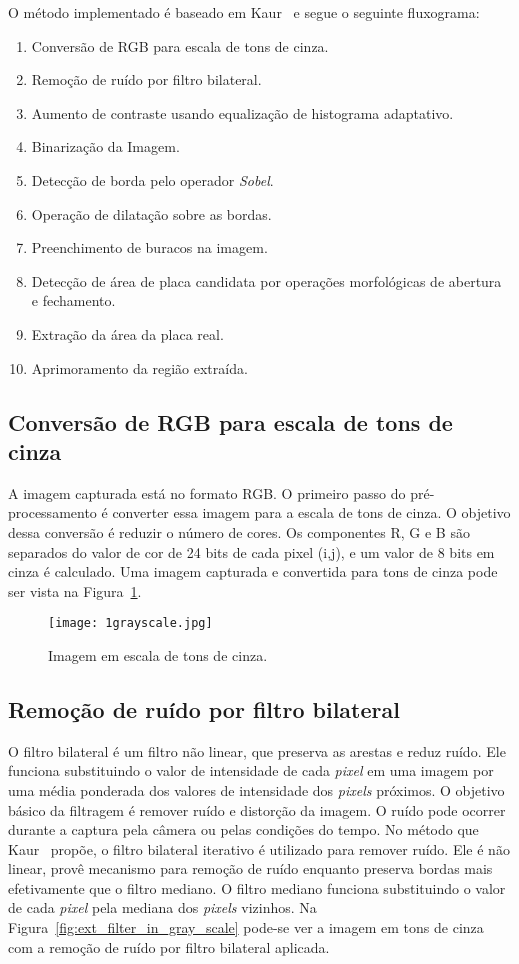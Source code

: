 O método implementado é baseado em Kaur~\cite{kaur2014efficient} e segue o seguinte fluxograma:

\begin{enumerate}
	\item Conversão de RGB para escala de tons de cinza.
	\item Remoção de ruído por filtro bilateral.
	\item Aumento de contraste usando equalização de histograma adaptativo.
	\item Binarização da Imagem.
	\item Detecção de borda pelo operador \emph{Sobel}.
	\item Operação de dilatação sobre as bordas.
	\item Preenchimento de buracos na imagem.
	\item Detecção de área de placa candidata por operações morfológicas de abertura e fechamento.
	\item Extração da área da placa real.
	\item Aprimoramento da região extraída.
\end{enumerate}

\subsection{Conversão de RGB para escala de tons de cinza}

A imagem capturada está no formato RGB\@. O primeiro passo do pré-processamento
é converter essa imagem para a escala de tons de cinza. O objetivo dessa
conversão é reduzir o número de cores. Os componentes R, G e B são separados do
valor de cor de 24 bits de cada pixel (i,j), e um valor de 8 bits em cinza é
calculado. Uma imagem capturada e convertida para tons de cinza pode ser vista
na Figura~\ref{fig:ext_gray_scale}.

\begin{figure}[H]
	\centering
	\texttt{[image: 1grayscale.jpg]}
	\caption{Imagem em escala de tons de cinza.}
	\label{fig:ext_gray_scale}
\end{figure}

\subsection{Remoção de ruído por filtro bilateral}

O filtro bilateral é um filtro não linear, que preserva as arestas e reduz
ruído. Ele funciona substituindo o valor de intensidade de cada \emph{pixel} em
uma imagem por uma média ponderada dos valores de intensidade dos \emph{pixels}
próximos. O objetivo básico da filtragem é remover ruído e distorção da imagem.
O ruído pode ocorrer durante a captura pela câmera ou pelas condições do tempo.
No método que Kaur~\cite{kaur2014efficient} propõe, o filtro bilateral iterativo
é utilizado para remover ruído. Ele é não linear, provê mecanismo para remoção
de ruído enquanto preserva bordas mais efetivamente que o filtro mediano. O
filtro mediano funciona substituindo o valor de cada \emph{pixel} pela mediana
dos \emph{pixels} vizinhos. Na Figura~\ref{fig:ext_filter_in_gray_scale} pode-se
ver a imagem em tons de cinza com a remoção de ruído por filtro bilateral
aplicada.

